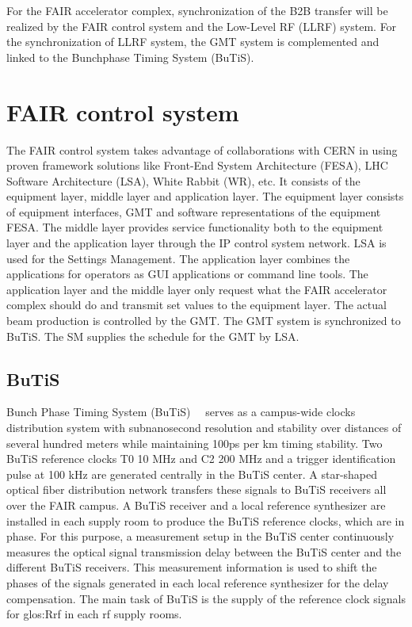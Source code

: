 
For the FAIR accelerator complex, synchronization of the B2B transfer will be realized by the FAIR control system and the Low-Level RF (LLRF) system. For the synchronization of LLRF system, the GMT system is complemented and linked to the Bunchphase Timing System (BuTiS). 
\section{FAIR control system}
The \gls{FAIR} control system takes advantage of collaborations with CERN in using proven framework solutions like Front-End System Architecture (\gls{FESA}), LHC Software Architecture (\gls{LSA}), White Rabbit (\gls{WR}), etc. It consists of the equipment layer, middle layer and application layer. The equipment layer consists of equipment interfaces, GMT and software representations of the equipment FESA. The middle layer provides service functionality both to the equipment layer and the application layer through the IP control system network. LSA is used for the Settings Management. The application layer combines the applications for operators as GUI applications or command line tools. The application layer and the middle layer only request what the FAIR accelerator complex should do and transmit set values to the equipment layer. The actual beam production is controlled by the GMT. The GMT system is synchronized to BuTiS. The \gls{SM} supplies the schedule for the GMT by LSA.

\subsection{BuTiS}
Bunch Phase Timing System (BuTiS)~\cite{moritz_butisdevelopment_2006}~\cite{zipfel_recent_2011} serves as a campus-wide clocks distribution system with subnanosecond resolution and stability over distances of several hundred meters while maintaining 100ps per km timing stability. Two BuTiS reference clocks T0 10 MHz and C2 200 MHz and a trigger identification pulse at 100 kHz are generated centrally in the BuTiS center. A star-shaped optical fiber distribution network transfers these signals to BuTiS receivers all over the FAIR campus. A BuTiS receiver and a local reference synthesizer are installed in each supply room to produce the BuTiS reference clocks, which are in phase. For this purpose, a measurement setup in the BuTiS center continuously measures the optical signal transmission delay between the BuTiS center and the different BuTiS receivers. This measurement information is used to shift the phases of the signals generated in each local reference synthesizer for the delay compensation. The main task of BuTiS is the supply of the reference clock signals for \gls{glos:Rrf} in each rf supply rooms.

